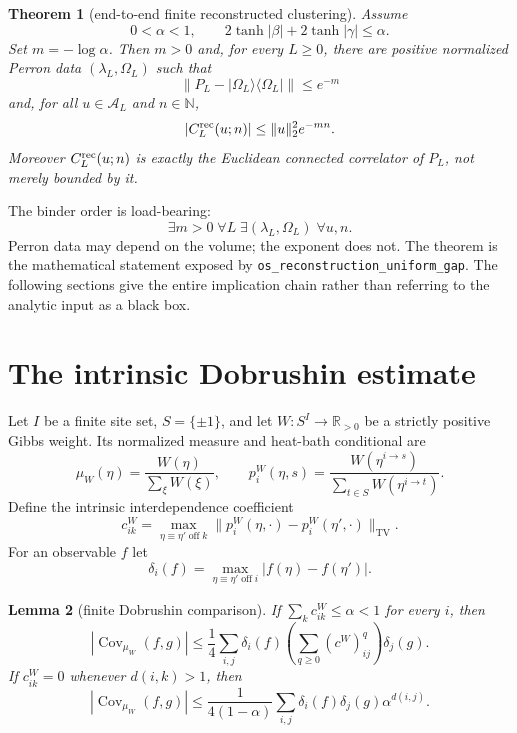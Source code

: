 \documentclass[11pt]{article}
\newtheorem{theorem}{Theorem}[section]
\newtheorem{lemma}[theorem]{Lemma}
\theoremstyle{definition}
\theoremstyle{remark}
\newcommand{\R}{\mathbb{R}}
\newcommand{\cA}{\mathcal{A}}
\newcommand{\Cov}{\operatorname{Cov}}
\newcommand{\TV}{\operatorname{TV}}
\newcommand{\lean}[1]{\nolinkurl{#1}}
\begin{document}
\begin{theorem}[end-to-end finite reconstructed clustering]
\label{thm:main}
Assume
\[
  0<\alpha<1,
  \qquad 2\tanh|\beta|+2\tanh|\gamma|\leq\alpha .
\]
Set $m=-\log\alpha$.  Then $m>0$ and, for every $L\geq0$, there are positive
normalized Perron data $(\lambda_L,\Omega_L)$ such that
\[
  \|P_L-|\Omega_L\rangle\langle\Omega_L|\|\leq e^{-m}
\]
and, for all $u\in\cA_L$ and $n\in\mathbb N$,
\[
  |C^{\rm rec}_L(u;n)|
  \leq \|u\|_2^2 e^{-mn}.
\]
Moreover $C^{\rm rec}_L(u;n)$ is exactly the Euclidean connected correlator
of $P_L$, not merely bounded by it.
\end{theorem}

The binder order is load-bearing:
\[
  \exists m>0\;\forall L\;\exists(\lambda_L,\Omega_L)\;\forall u,n.
\]
Perron data may depend on the volume; the exponent does not.  The theorem is
the mathematical statement exposed by
\lean{os\_reconstruction\_uniform\_gap}.  The following sections give the
entire implication chain rather than referring to the analytic input as a
black box.

\section{The intrinsic Dobrushin estimate}
\label{sec:dobrushin}

Let $I$ be a finite site set, $S=\{\pm1\}$, and let $W:S^I\to\R_{>0}$ be a
strictly positive Gibbs weight.  Its normalized measure and heat-bath
conditional are
\[
  \mu_W(\eta)=\frac{W(\eta)}{\sum_\xi W(\xi)},
  \qquad
  p_i^W(\eta,s)=
  \frac{W(\eta^{i\to s})}{\sum_{t\in S}W(\eta^{i\to t})}.
\]
Define the intrinsic interdependence coefficient
\[
  c^W_{ik}=
  \max_{\eta\equiv\eta'\;\mathrm{off}\;k}
  \|p_i^W(\eta,\cdot)-p_i^W(\eta',\cdot)\|_{\TV}.
\]
For an observable $f$ let
\[
  \delta_i(f)=\max_{\eta\equiv\eta'\;\mathrm{off}\;i}
  |f(\eta)-f(\eta')|.
\]

\begin{lemma}[finite Dobrushin comparison]
\label{lem:comparison}
If $\sum_k c^W_{ik}\leq\alpha<1$ for every $i$, then
\[
  |\Cov_{\mu_W}(f,g)|
  \leq \frac14\sum_{i,j}\delta_i(f)
       \left(\sum_{q\geq0}(c^W)^q_{ij}\right)\delta_j(g).
\]
If $c^W_{ik}=0$ whenever $d(i,k)>1$, then
\[
  |\Cov_{\mu_W}(f,g)|
  \leq \frac{1}{4(1-\alpha)}
  \sum_{i,j}\delta_i(f)\delta_j(g)\alpha^{d(i,j)}.
\]
\end{lemma}
\end{document}
